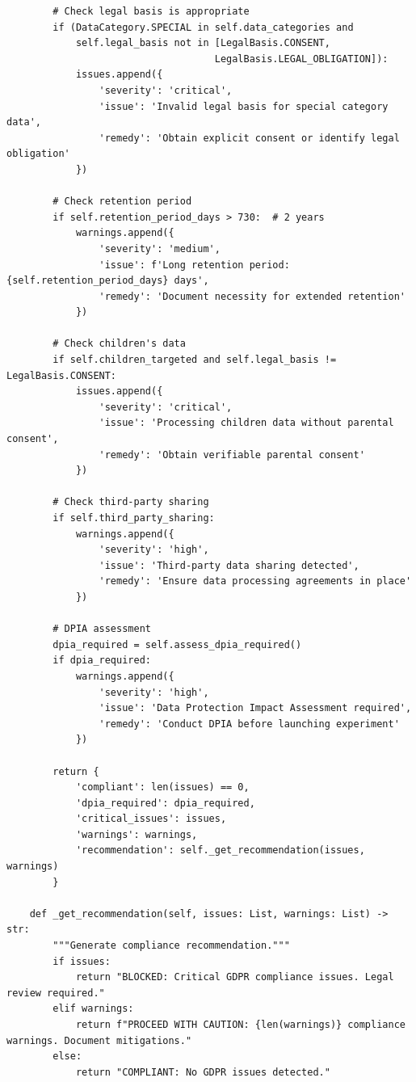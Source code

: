 \begin{lstlisting}
        # Check legal basis is appropriate
        if (DataCategory.SPECIAL in self.data_categories and
            self.legal_basis not in [LegalBasis.CONSENT,
                                    LegalBasis.LEGAL_OBLIGATION]):
            issues.append({
                'severity': 'critical',
                'issue': 'Invalid legal basis for special category data',
                'remedy': 'Obtain explicit consent or identify legal obligation'
            })

        # Check retention period
        if self.retention_period_days > 730:  # 2 years
            warnings.append({
                'severity': 'medium',
                'issue': f'Long retention period: {self.retention_period_days} days',
                'remedy': 'Document necessity for extended retention'
            })

        # Check children's data
        if self.children_targeted and self.legal_basis != LegalBasis.CONSENT:
            issues.append({
                'severity': 'critical',
                'issue': 'Processing children data without parental consent',
                'remedy': 'Obtain verifiable parental consent'
            })

        # Check third-party sharing
        if self.third_party_sharing:
            warnings.append({
                'severity': 'high',
                'issue': 'Third-party data sharing detected',
                'remedy': 'Ensure data processing agreements in place'
            })

        # DPIA assessment
        dpia_required = self.assess_dpia_required()
        if dpia_required:
            warnings.append({
                'severity': 'high',
                'issue': 'Data Protection Impact Assessment required',
                'remedy': 'Conduct DPIA before launching experiment'
            })

        return {
            'compliant': len(issues) == 0,
            'dpia_required': dpia_required,
            'critical_issues': issues,
            'warnings': warnings,
            'recommendation': self._get_recommendation(issues, warnings)
        }

    def _get_recommendation(self, issues: List, warnings: List) -> str:
        """Generate compliance recommendation."""
        if issues:
            return "BLOCKED: Critical GDPR compliance issues. Legal review required."
        elif warnings:
            return f"PROCEED WITH CAUTION: {len(warnings)} compliance warnings. Document mitigations."
        else:
            return "COMPLIANT: No GDPR issues detected."


\end{lstlisting}
